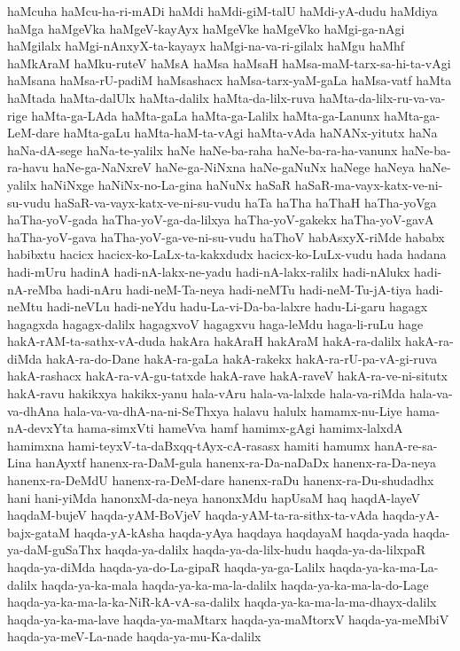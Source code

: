 {haMcuha
haMcu-ha-ri-mADi
haMdi
haMdi-giM-talU
haMdi-yA-dudu
haMdiya
haMga
haMgeVka
haMgeV-kayAyx
haMgeVke
haMgeVko
haMgi-ga-nAgi
haMgilalx
haMgi-nAnxyX-ta-kayayx
haMgi-na-va-ri-gilalx
haMgu
haMhf
haMkAraM
haMku-ruteV
haMsA
haMsa
haMsaH
haMsa-maM-tarx-sa-hi-ta-vAgi
haMsana
haMsa-rU-padiM
haMsashacx
haMsa-tarx-yaM-gaLa
haMsa-vatf
haMta
haMtada
haMta-dalUlx
haMta-dalilx
haMta-da-lilx-ruva
haMta-da-lilx-ru-va-va-rige
haMta-ga-LAda
haMta-gaLa
haMta-ga-Lalilx
haMta-ga-Lanunx
haMta-ga-LeM-dare
haMta-gaLu
haMta-haM-ta-vAgi
haMta-vAda
haNANx-yitutx
haNa
haNa-dA-sege
haNa-te-yalilx
haNe
haNe-ba-raha
haNe-ba-ra-ha-vanunx
haNe-ba-ra-havu
haNe-ga-NaNxreV
haNe-ga-NiNxna
haNe-gaNuNx
haNege
haNeya
haNe-yalilx
haNiNxge
haNiNx-no-La-gina
haNuNx
haSaR
haSaR-ma-vayx-katx-ve-ni-su-vudu
haSaR-va-vayx-katx-ve-ni-su-vudu
haTa
haTha
haThaH
haTha-yoVga
haTha-yoV-gada
haTha-yoV-ga-da-lilxya
haTha-yoV-gakekx
haTha-yoV-gavA
haTha-yoV-gava
haTha-yoV-ga-ve-ni-su-vudu
haThoV
habAsxyX-riMde
hababx
habibxtu
hacicx
hacicx-ko-LaLx-ta-kakxdudx
hacicx-ko-LuLx-vudu
hada
hadana
hadi-mUru
hadinA
hadi-nA-lakx-ne-yadu
hadi-nA-lakx-ralilx
hadi-nAlukx
hadi-nA-reMba
hadi-nAru
hadi-neM-Ta-neya
hadi-neMTu
hadi-neM-Tu-jA-tiya
hadi-neMtu
hadi-neVLu
hadi-neYdu
hadu-La-vi-Da-ba-lalxre
hadu-Li-garu
hagagx
hagagxda
hagagx-dalilx
hagagxvoV
hagagxvu
haga-leMdu
haga-li-ruLu
hage
hakA-rAM-ta-sathx-vA-duda
hakAra
hakAraH
hakAraM
hakA-ra-dalilx
hakA-ra-diMda
hakA-ra-do-Dane
hakA-ra-gaLa
hakA-rakekx
hakA-ra-rU-pa-vA-gi-ruva
hakA-rashacx
hakA-ra-vA-gu-tatxde
hakA-rave
hakA-raveV
hakA-ra-ve-ni-situtx
hakA-ravu
hakikxya
hakikx-yanu
hala-vAru
hala-va-lalxde
hala-va-riMda
hala-va-va-dhAna
hala-va-va-dhA-na-ni-SeThxya
halavu
halulx
hamamx-nu-Liye
hama-nA-devxYta
hama-simxVti
hameVva
hamf
hamimx-gAgi
hamimx-lalxdA
hamimxna
hami-teyxV-ta-daBxqq-tAyx-cA-rasasx
hamiti
hamumx
hanA-re-sa-Lina
hanAyxtf
hanenx-ra-DaM-gula
hanenx-ra-Da-naDaDx
hanenx-ra-Da-neya
hanenx-ra-DeMdU
hanenx-ra-DeM-dare
hanenx-raDu
hanenx-ra-Du-shudadhx
hani
hani-yiMda
hanonxM-da-neya
hanonxMdu
hapUsaM
haq
haqdA-layeV
haqdaM-bujeV
haqda-yAM-BoVjeV
haqda-yAM-ta-ra-sithx-ta-vAda
haqda-yA-bajx-gataM
haqda-yA-kAsha
haqda-yAya
haqdaya
haqdayaM
haqda-yada
haqda-ya-daM-guSaThx
haqda-ya-dalilx
haqda-ya-da-lilx-hudu
haqda-ya-da-lilxpaR
haqda-ya-diMda
haqda-ya-do-La-gipaR
haqda-ya-ga-Lalilx
haqda-ya-ka-ma-La-dalilx
haqda-ya-ka-mala
haqda-ya-ka-ma-la-dalilx
haqda-ya-ka-ma-la-do-Lage
haqda-ya-ka-ma-la-ka-NiR-kA-vA-sa-dalilx
haqda-ya-ka-ma-la-ma-dhayx-dalilx
haqda-ya-ka-ma-lave
haqda-ya-maMtarx
haqda-ya-maMtorxV
haqda-ya-meMbiV
haqda-ya-meV-La-nade
haqda-ya-mu-Ka-dalilx
}
